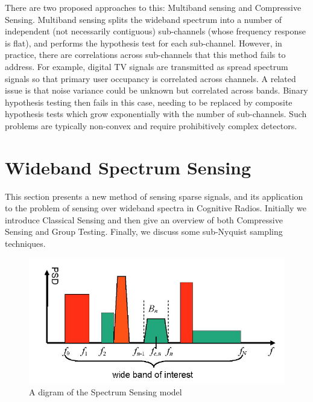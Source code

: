 \documentclass[conference]{IEEEtran}
\begin{document}
There are two proposed approaches to this: Multiband sensing and Compressive Sensing. Multiband sensing splits the wideband spectrum into a number of independent (not necessarily contiguous) sub-channels (whose frequency response is flat), and performs the hypothesis test for each sub-channel. However, in practice, there are correlations across sub-channels that this method fails to address. For example, digital TV signals are transmitted as spread spectrum signals so that primary user occupancy is correlated across channels. A related issue is that noise variance could be unknown but correlated across bands. Binary hypothesis testing then fails in this case, needing to be replaced by composite hypothesis tests which grow exponentially with the number of sub-channels. Such problems are typically non-convex and require prohibitively complex detectors.

\section{Wideband Spectrum Sensing}
This section presents a new method of sensing sparse signals, and its application to the problem of sensing over wideband spectra in Cognitive Radios. Initially we introduce Classical Sensing and then give an overview of both Compressive Sensing and Group Testing. Finally, we discuss some sub-Nyquist sampling techniques.

\begin{figure}[h]
\centering
\includegraphics[height = 7 cm]{bands.png}
\caption{A digram of the Spectrum Sensing model \cite{Tian}}
\label{widebandspectra}
\end{figure}
\end{document}
